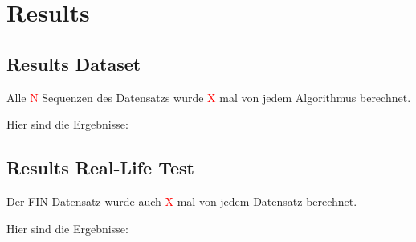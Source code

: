 \documentclass[main.tex]{subfiles}
\begin{document}
\section{Results}
\subsection{Results Dataset}

Alle \textcolor{red}{N} Sequenzen des Datensatzs wurde \textcolor{red}{X} mal von jedem Algorithmus berechnet.

Hier sind die Ergebnisse:

\subsection{Results Real-Life Test}

Der FIN Datensatz wurde auch \textcolor{red}{X} mal von jedem Datensatz berechnet.

Hier sind die Ergebnisse:
\end{document}
